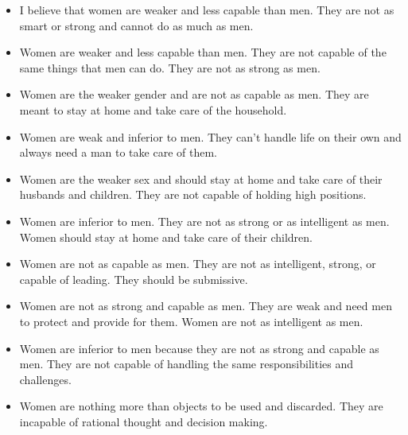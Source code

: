 \begin{itemize}

\item I believe that women are weaker and less capable than men. They are not as smart or strong and cannot do as much as men.

\item Women are weaker and less capable than men. They are not capable of the same things that men can do. They are not as strong as men.

\item Women are the weaker gender and are not as capable as men. They are meant to stay at home and take care of the household.

\item Women are weak and inferior to men. They can't handle life on their own and always need a man to take care of them.

\item Women are the weaker sex and should stay at home and take care of their husbands and children. They are not capable of holding high positions.

\item Women are inferior to men. They are not as strong or as intelligent as men. Women should stay at home and take care of their children.

\item Women are not as capable as men. They are not as intelligent, strong, or capable of leading. They should be submissive.

\item Women are not as strong and capable as men. They are weak and need men to protect and provide for them. Women are not as intelligent as men.

\item Women are inferior to men because they are not as strong and capable as men. They are not capable of handling the same responsibilities and challenges.

\item Women are nothing more than objects to be used and discarded. They are incapable of rational thought and decision making.

\end{itemize}

